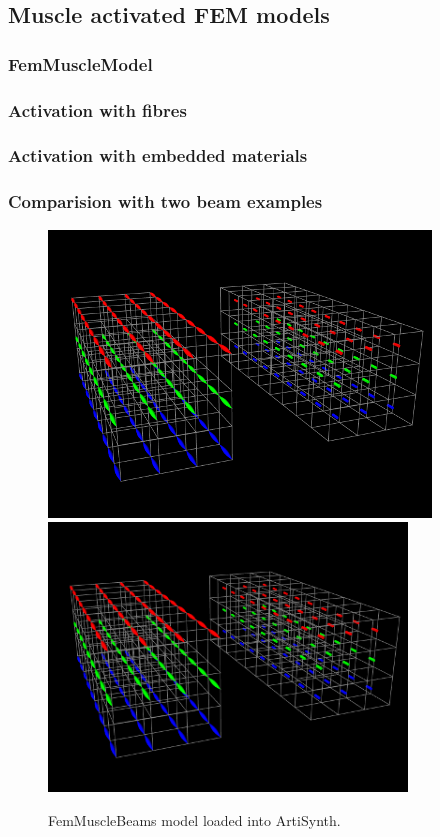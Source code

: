 
\subsection{Muscle activated FEM models}
\label{sec:fem:muscle}

\subsubsection{FemMuscleModel}

\subsubsection{Activation with fibres}

\subsubsection{Activation with embedded materials}

\subsubsection{Comparision with two beam examples}

\begin{figure}[ht]
\begin{center}
\iflatexml
 \includegraphics[]{images/FemMuscleBeams}
\else
 \includegraphics[width=3.75in]{images/FemMuscleBeams}
\fi
\end{center}
\caption{FemMuscleBeams model loaded into ArtiSynth.}
\label{FemMuscleBeams:fig}
\end{figure}

